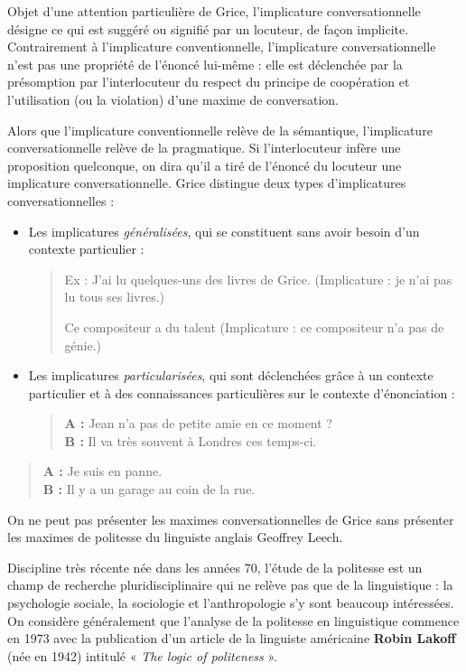 Objet d’une attention particulière de Grice, l’implicature conversationnelle désigne ce qui est suggéré ou signifié par un locuteur, de façon implicite. Contrairement à l’implicature conventionnelle, l’implicature conversationnelle n’est pas une propriété de l’énoncé lui-même : elle est déclenchée par la présomption par l’interlocuteur du respect du principe de coopération et l’utilisation (ou la violation) d’une maxime de conversation.

Alors que l’implicature conventionnelle relève de la sémantique, l’implicature conversationnelle relève de la pragmatique. Si l’interlocuteur infère une proposition quelconque, on dira qu’il a tiré de l’énoncé du locuteur une implicature conversationnelle. Grice distingue deux types d’implicatures conversationnelles :
\begin{itemize}
\item Les implicatures \textit{généralisées}, qui se constituent sans avoir besoin d’un contexte particulier :
\begin{quote}
Ex : J’ai lu quelques-uns des livres de Grice. (Implicature : je n’ai pas lu tous ses livres.)

Ce compositeur a du talent (Implicature : ce compositeur n’a pas de génie.)
\end{quote}
\item Les implicatures \textit{particularisées}, qui sont déclenchées grâce à un contexte particulier et à des connaissances particulières sur le contexte d’énonciation :
\begin{quote}
\textbf{A :} Jean n’a pas de petite amie en ce moment ?\\
\textbf{B :} Il va très souvent à Londres ces temps-ci.
\end{quote}
\end{itemize}

\begin{quote}
\textbf{A :} Je suis en panne.\\
\textbf{B :} Il y a un garage au coin de la rue.
\end{quote}
On ne peut pas présenter les maximes conversationnelles de Grice sans présenter les maximes de politesse du linguiste anglais Geoffrey Leech.

Discipline très récente née dans les années 70, l’étude de la politesse est un champ de recherche pluridisciplinaire qui ne relève pas que de la linguistique : la psychologie sociale, la sociologie et l’anthropologie s’y sont beaucoup intéressées. On considère généralement que l’analyse de la politesse en linguistique commence en 1973 avec la publication d’un article de la linguiste américaine \textbf{Robin Lakoff} (née en 1942) intitulé « \textit{The logic of politeness} ».


